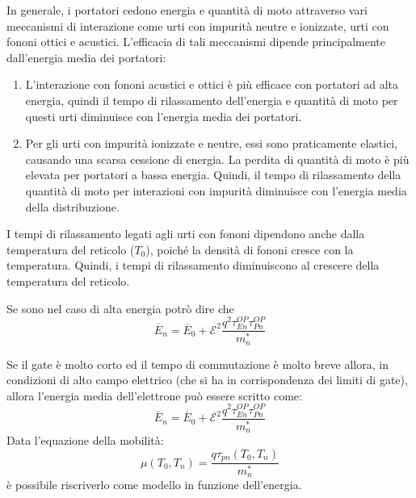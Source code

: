  \begin{exbox}[QUINDI]
In generale, i portatori cedono energia e quantità di moto attraverso vari meccanismi di interazione come urti con impurità neutre e ionizzate, urti con fononi ottici e acustici. L'efficacia di tali meccanismi dipende principalmente dall'energia media dei portatori: 
\begin{enumerate}
    \item L'interazione con fononi acustici e ottici è più efficace con portatori ad alta energia, quindi il tempo di rilassamento dell'energia e quantità di moto per questi urti diminuisce con l'energia media dei portatori. 
    
    \item Per gli urti con impurità ionizzate e neutre, essi sono praticamente elastici, causando una scarsa cessione di energia. La perdita di quantità di moto è più elevata per portatori a bassa energia. Quindi, il tempo di rilassamento della quantità di moto per interazioni con impurità diminuisce con l'energia media della distribuzione.
\end{enumerate}
I tempi di rilassamento legati agli urti con fononi dipendono anche dalla temperatura del reticolo ($T_0$), poiché la densità di fononi cresce con la temperatura. Quindi, i tempi di rilassamento diminuiscono al crescere della temperatura del reticolo.

Se sono nel caso di alta energia potrò dire che
\begin{equation}
    \overline{E}_n=\overline{E}_0 +\mathcal{E}^2 \dfrac{q^2 \tau_{En}^{OP} \tau_{Pn}^{OP}}{m_n^*}
\end{equation}
\end{exbox}

Se il gate è molto corto ed il tempo di commutazione è molto breve allora, in condizioni di alto campo elettrico (che si ha in corrispondenza dei limiti di gate), allora l'energia media dell'elettrone può essere scritto come:
\begin{equation}
    \overline{E}_n=\overline{E}_0 +\mathcal{E}^2 \dfrac{q^2 \tau_{En}^{OP} \tau_{Pn}^{OP}}{m_n^*}
\end{equation}
Data l'equazione della mobilità:
 \begin{equation}
     \mu(T_0,T_n)=\dfrac{q \tau_{pn}(T_0,T_n)}{m_n^*}
 \end{equation}
è possibile riscriverlo come modello in funzione dell'energia.\\
%

